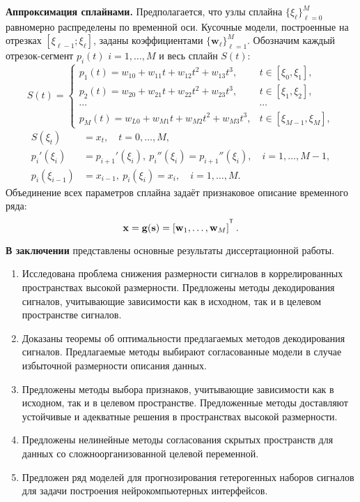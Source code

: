 \documentclass[11pt, a5paper]{dissert}
\begin{document}
\textbf{Аппроксимация сплайнами.}
Предполагается, что узлы сплайна $\{\xi_\ell\}_{\ell=0}^M$ равномерно распределены по временной оси.
Кусочные модели, построенные на отрезках $[\xi_{\ell-1}; \xi_{\ell}]$, заданы коэффициентами $\{\mathbf{w}_\ell\}_{\ell=1}^{M}$.
Обозначим каждый отрезок-сегмент $p_i(t)$ $i = 1, \dots, M$ и весь сплайн $S(t)$:
\begin{equation*}
	S(t) = \begin{cases}
		p_1(t) = w_{10} +w_{11}t + w_{12}t^2 + w_{13}t^3, & t\in [\xi_0, \xi_1],\\
		p_2(t) = w_{20} +w_{21}t + w_{22}t^2 + w_{23}t^3, & t\in [\xi_1, \xi_2],\\
		\cdots&\cdots \\
		p_{M}(t) = w_{L0} +w_{M1}t + w_{M2}t^2 + w_{M3}t^3, & t\in [\xi_{M-1}, \xi_M],					
	\end{cases}
\end{equation*}
\begin{align*}
	S(\xi_t) &= x_t, \quad t = 0, \dots, M,\\
	p_i'(\xi_i) &= p_{i+1}'(\xi_i),\: p_i''(\xi_i) = p_{i+1}''(\xi_i), \quad i = 1, \dots, M-1,\\
	p_i(\xi_{i-1}) &= x_{i-1},\: p_i(\xi_i) = x_i, \quad i = 1, \dots, M.
\end{align*}
Объединение всех параметров сплайна задаёт признаковое описание временного ряда:
\[
	\bx = \mathbf{g}(\bs) = \left[\mathbf{w}_1, \dots, \mathbf{w}_{M}\right]^{\T}.
\]

\textbf{В заключении} представлены основные результаты диссертационной работы.

\begin{enumerate}
	\item Исследована проблема снижения размерности сигналов в коррелированных пространствах высокой размерности. 
	Предложены методы декодирования сигналов, учитывающие зависимости как в исходном, так и в целевом пространстве сигналов.
	\item Доказаны теоремы об оптимальности предлагаемых методов декодирования сигналов. Предлагаемые методы выбирают согласованные модели в случае избыточной размерности описания данных.
	\item Предложены методы выбора признаков, учитывающие зависимости как в исходном, так и в целевом пространстве. Предложенные методы доставляют устойчивые и адекватные решения в пространствах высокой размерности.
	\item Предложены нелинейные методы согласования скрытых пространств для данных со сложноорганизованной целевой переменной.
	\item Предложен ряд моделей для прогнозирования гетерогенных наборов сигналов для задачи построения нейрокомпьютерных интерфейсов.
\end{enumerate}
\end{document}
